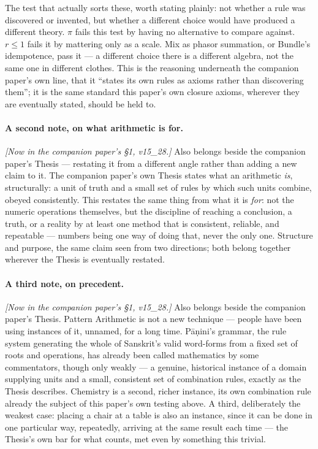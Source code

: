 \documentclass[12pt, a4paper]{article}
\begin{document}
The test that actually sorts these, worth stating plainly: not
whether a rule was discovered or invented, but whether a different
choice would have produced a different theory. $\pi$ fails this test
by having no alternative to compare against. $r\le1$ fails it by
mattering only as a scale. Mix as phasor summation, or Bundle's idempotence, pass it --- a different choice there is a different
algebra, not the same one in different clothes. This is the
reasoning underneath the companion paper's own
line, that it ``states its own rules as axioms rather than
discovering them''; it is the same standard this paper's own closure
axioms, wherever they are eventually stated, should be held to.

\paragraph{A second note, on what arithmetic is for.} \emph{[Now in the companion paper's \S1, v15\_28.]} Also belongs
beside the companion paper's Thesis --- restating it from a different
angle rather than adding a new claim to it. The companion paper's own
Thesis states what an arithmetic \emph{is}, structurally: a unit of
truth and a small set of rules by which such units combine, obeyed
consistently. This restates the same thing from what it is
\emph{for}: not the numeric operations themselves, but the discipline
of reaching a conclusion, a truth, or a reality by at least one
method that is consistent, reliable, and repeatable --- numbers being
one way of doing that, never the only one. Structure and purpose,
the same claim seen from two directions; both belong together
wherever the Thesis is eventually restated.

\paragraph{A third note, on precedent.} \emph{[Now in the companion paper's \S1, v15\_28.]} Also belongs beside the
companion paper's Thesis. Pattern Arithmetic is not a new technique
--- people have been using instances of it, unnamed, for a long
time. P\={a}\d{n}ini's grammar, the rule system generating the whole
of Sanskrit's valid word-forms from a fixed set of roots and
operations, has already been called mathematics by some
commentators, though only weakly --- a genuine, historical instance
of a domain supplying units and a small, consistent set of
combination rules, exactly as the Thesis describes. Chemistry is a
second, richer instance, its own combination rule already the
subject of this paper's own testing above. A third, deliberately the
weakest case: placing a chair at a table is also an instance, since
it can be done in one particular way, repeatedly, arriving at the
same result each time --- the Thesis's own bar for what counts, met
even by something this trivial.
\end{document}
